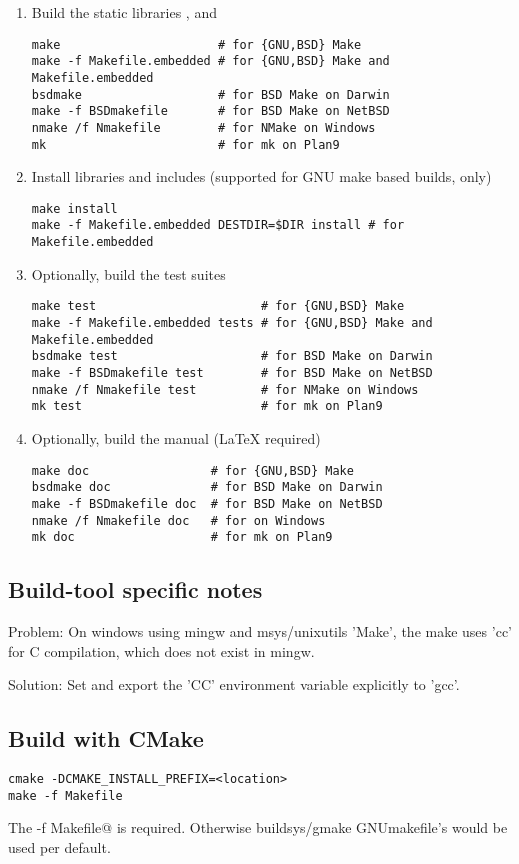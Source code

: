 \begin{enumerate}
\item Build the static libraries ,  and 
\begin{lstlisting}
make                      # for {GNU,BSD} Make
make -f Makefile.embedded # for {GNU,BSD} Make and Makefile.embedded
bsdmake                   # for BSD Make on Darwin
make -f BSDmakefile       # for BSD Make on NetBSD
nmake /f Nmakefile        # for NMake on Windows
mk                        # for mk on Plan9
\end{lstlisting}

\item Install libraries and includes (supported for GNU make based builds, only)
\begin{lstlisting}
make install 
make -f Makefile.embedded DESTDIR=$DIR install # for Makefile.embedded
\end{lstlisting}

\item Optionally, build the test suites
\begin{lstlisting}
make test                       # for {GNU,BSD} Make
make -f Makefile.embedded tests # for {GNU,BSD} Make and Makefile.embedded
bsdmake test                    # for BSD Make on Darwin
make -f BSDmakefile test        # for BSD Make on NetBSD
nmake /f Nmakefile test         # for NMake on Windows
mk test                         # for mk on Plan9
\end{lstlisting}%

\item Optionally, build the manual (LaTeX required)
\begin{lstlisting}
make doc                 # for {GNU,BSD} Make
bsdmake doc              # for BSD Make on Darwin
make -f BSDmakefile doc  # for BSD Make on NetBSD
nmake /f Nmakefile doc   # for on Windows
mk doc                   # for mk on Plan9
\end{lstlisting}%
\end{enumerate}

\subsection{Build-tool specific notes}

Problem: On windows using mingw and msys/unixutils 'Make', the make uses
'cc' for C compilation, which does not exist in mingw.

Solution: Set and export the 'CC' environment variable explicitly to 'gcc'. 

\subsection{Build with CMake}

\begin{lstlisting}
cmake -DCMAKE_INSTALL_PREFIX=<location>
make -f Makefile
\end{lstlisting}

The \verb@-f Makefile@ is required. Otherwise buildsys/gmake GNUmakefile's 
would be used per default.

